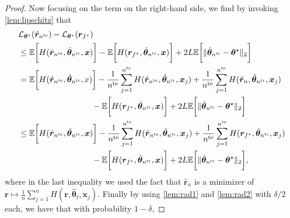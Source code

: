 \begin{proof}
    Now focusing on the term on the right-hand side, we find by invoking \cref{lem:lipschitz} that
    \begin{align}
    &\mathcal{L}_{\boldsymbol{\theta}^\star}(\hat{\boldsymbol{r}}_{{n}^{\text{te}}}) - \mathcal{L}_{\boldsymbol{\theta}^\star}(\boldsymbol{r}_{f^\star}) \nonumber \\
    &\leq \mathbb{E}\bigg[ H(\hat{\boldsymbol{r}}_{{n}^{\text{te}}}, \hat{\boldsymbol{\theta}}_{{n}^{\text{tr}}}, \boldsymbol{x}) \bigg] 
    - \mathbb{E}\bigg[ H(\boldsymbol{r}_{f^\star}, \hat{\boldsymbol{\theta}}_{{n}^{\text{tr}}}, \boldsymbol{x}) \bigg]
    + 2L \mathbb{E}\bigg[\|\hat{\boldsymbol{\theta}}_{{n}^{\text{tr}}} - \boldsymbol{\theta}^\star\|_2 \bigg] \nonumber\\ 
    &= \mathbb{E}\bigg[H(\hat{\boldsymbol{r}}_{{n}^{\text{te}}}, \hat{\boldsymbol{\theta}}_{{n}^{\text{tr}}}, x) \bigg] 
    - \frac{1}{{n}^{\text{te}}}\sum_{j=1}^{{n}^{\text{te}}}H(\hat{\boldsymbol{r}}_{{n}^{\text{te}}}, \hat{\boldsymbol{\theta}}_{{{n}^{\text{tr}}}}, \boldsymbol{x}_j)
    + \frac{1}{{n}^{\text{te}}}\sum_{j=1}^{{n}^{\text{te}}}H(\hat{\boldsymbol{r}}_{n}, \hat{\boldsymbol{\theta}}_{{n}^{\text{tr}}}, \boldsymbol{x}_j) \nonumber\\ 
     &\quad\quad\quad\quad\quad\quad\quad\quad\quad -\mathbb{E}\bigg[ H(\boldsymbol{r}_{f^\star}, \hat{\boldsymbol{\theta}}_{{n}^{\text{tr}}}, \boldsymbol{x}) \bigg]
    + 2L \mathbb{E}\bigg[\|\hat{\boldsymbol{\theta}}_{{n}^{\text{tr}}} - \boldsymbol{\theta}^\star\|_2 \bigg] \nonumber\\
    &\leq \mathbb{E}\bigg[H(\hat{\boldsymbol{r}}_{{n}^{\text{te}}}, \hat{\boldsymbol{\theta}}_{{n}^{\text{tr}}}, \boldsymbol{x})\bigg] 
    - \frac{1}{{n}^{\text{te}}}\sum_{j=1}^{{n}^{\text{te}}}H(\hat{\boldsymbol{r}}_{{n}^{\text{te}}}, \hat{\boldsymbol{\theta}}_{{n}^{\text{tr}}}, \boldsymbol{x}_j) 
    + \frac{1}{{n}^{\text{te}}}\sum_{j=1}^{{n}^{\text{te}}}H(\boldsymbol{r}_{f^\star}, \hat{\boldsymbol{\theta}}_{{n}^{\text{tr}}}, \boldsymbol{x}_j) \nonumber\\ 
    &\quad\quad\quad\quad\quad\quad\quad\quad\quad -\mathbb{E}\bigg[ H(\boldsymbol{r}_{f^\star}, \hat{\boldsymbol{\theta}}_{{n}^{\text{tr}}}, \boldsymbol{x}) \bigg]
    + 2L \mathbb{E}\bigg[\|\hat{\boldsymbol{\theta}}_{{n}^{\text{tr}}} - \boldsymbol{\theta}^\star\|_2 \bigg], \nonumber\\
    \end{align}
    where in the last inequality we used the fact that $\hat{\boldsymbol{r}}_{n}$ is a minimizer of $\boldsymbol{r} \mapsto \frac{1}{n}\sum_{j=1}^{n}H(\boldsymbol{r}, \hat{\boldsymbol{\theta}}_t, \boldsymbol{x}_j)$. Finally by using \cref{lem:rad1} and \cref{lem:rad2} with $\delta/2$ each, we have that with probability $1-\delta$,

\end{proof}
